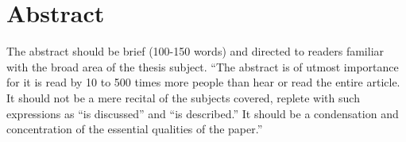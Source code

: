 \chapter*{Abstract}

\vspace*{2em}
The abstract should be brief (100-150 words) and directed to readers familiar with the broad area of the thesis subject. ``The abstract is of utmost importance for it is read by 10 to 500 times more people than hear or read the entire article. It should not be a mere recital of the subjects covered, replete with such expressions as ``is discussed'' and ``is described.'' It should be a condensation and concentration of the essential qualities of the paper.''